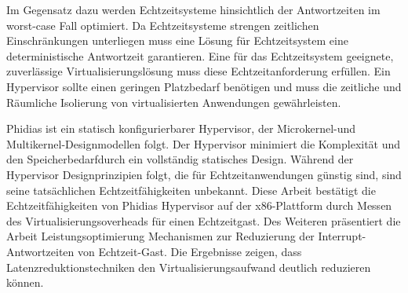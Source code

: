 Im Gegensatz dazu werden Echtzeitsysteme hinsichtlich der Antwortzeiten im worst-case Fall optimiert.
Da Echtzeitsysteme strengen zeitlichen Einschr{\"a}nkungen unterliegen muss eine L{\"o}sung f{\"u}r Echtzeitsystem eine deterministische Antwortzeit garantieren.
Eine f{\"u}r das Echtzeitsystem geeignete, zuverl{\"a}ssige Virtualisierungsl{\"o}sung muss diese Echtzeitanforderung erf{\"u}llen.
Ein Hypervisor sollte einen geringen Platzbedarf ben{\"o}tigen und muss die zeitliche und R{\"a}umliche Isolierung von virtualisierten Anwendungen gew{\"a}hrleisten.

Phidias ist ein statisch konfigurierbarer Hypervisor, der Microkernel-und Multikernel-Designmodellen folgt. 
Der Hypervisor minimiert die Komplexit{\"a}t und den Speicherbedarfdurch ein vollst{\"a}ndig statisches Design. 
W{\"a}hrend der Hypervisor Designprinzipien folgt, die f{\"u}r Echtzeitanwendungen g{\"u}nstig sind, sind seine tats{\"a}chlichen
Echtzeitf{\"a}higkeiten unbekannt. Diese Arbeit best{\"a}tigt die Echtzeitf{\"a}higkeiten von Phidias Hypervisor auf der x86-Plattform
durch Messen des Virtualisierungsoverheads f{\"u}r einen Echtzeitgast. Des Weiteren pr{\"a}sentiert die Arbeit Leistungsoptimierung
Mechanismen zur Reduzierung der Interrupt-Antwortzeiten von Echtzeit-Gast.
Die Ergebnisse zeigen, dass Latenzreduktionstechniken den Virtualisierungsaufwand deutlich reduzieren k{\"o}nnen.

